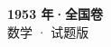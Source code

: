 \documentclass[zihao=-4, a4paper]{ctexart}
\begin{document}
\begin{center}
  {\Large\bfseries 1953 年·全国卷}\\[4pt]
  {\large 数学 · 试题版}
\end{center}
\medskip
{}

\end{document}
